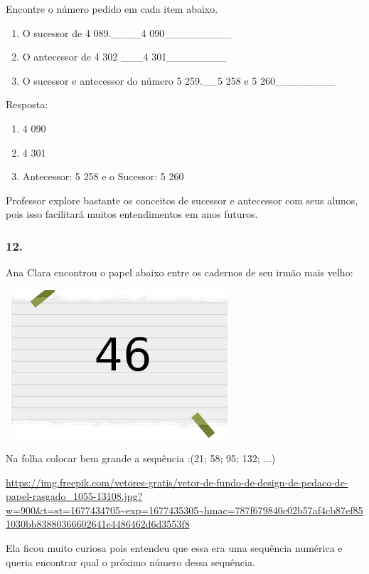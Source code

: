 Encontre o número pedido em cada item abaixo.

\begin{enumerate}
\def\labelenumi{\alph{enumi})}
\item
  O sucessor de 4 089.\_\_\_\_4 090\_\_\_\_\_\_\_\_\_
\item
  O antecessor de 4 302 \_\_\_4 301\_\_\_\_\_\_\_\_
\item
  O sucessor e antecessor do número 5 259.\_\_5 258 e 5
  260\_\_\_\_\_\_\_\_
\end{enumerate}

Resposta:

\begin{enumerate}
\def\labelenumi{\alph{enumi})}
\item
  4 090
\item
  4 301
\item
  Antecessor: 5 258 e o Sucessor: 5 260
\end{enumerate}

Professor explore bastante os conceitos de sucessor e antecessor com
seus alunos, pois isso facilitará muitos entendimentos em anos futuros.

\subsubsection{12.}\label{section-44}

Ana Clara encontrou o papel abaixo entre os cadernos de seu irmão mais
velho:

\includegraphics[width=3.30833in,height=2.17391in]{media/image2.png}

Na folha colocar bem grande a sequência :(21; 58; 95; 132; ...)

\url{https://img.freepik.com/vetores-gratis/vetor-de-fundo-de-design-de-pedaco-de-papel-rasgado_1055-13108.jpg?w=900\&t=st=1677434705~exp=1677435305~hmac=787f679840c02b57af4cb87ef851030bb83880366602641e4486462d6d3553f8}

Ela ficou muito curiosa pois entendeu que essa era uma sequência
numérica e queria encontrar qual o próximo número dessa sequência.

